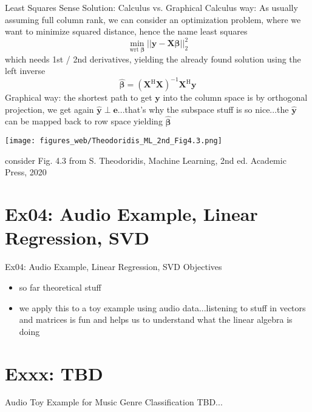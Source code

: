 \documentclass[mathserif, aspectratio=43]{intbeamer}
\begin{document}
\begin{frame}{Least Squares Sense Solution: Calculus vs. Graphical}
Calculus way: As usually assuming full column rank, we can consider an optimization problem, where we want to minimize
squared distance, hence the name least squares
$$\min_{\text{wrt }\bm{\beta}} ||\bm{y} - \bm{X} \bm{\beta}||_2^2$$
which needs 1st / 2nd derivatives, yielding the already found solution using the left inverse
$$\hat{\bm{\beta}} = (\bm{X}^\mathrm{H}\bm{X})^{-1} \bm{X}^\mathrm{H} \bm{y}$$
Graphical way: the shortest path to get $\bm{y}$ into the column space is by orthogonal projection, we get again $\hat{\bm{y}} \perp \bm{e}$...that's why the subspace
stuff is so nice...the $\hat{\bm{y}}$ can be mapped back to row space yielding $\hat{\bm{\beta}}$
\begin{center}
\texttt{[image: figures\_web/Theodoridis\_ML\_2nd\_Fig4.3.png]}
\end{center}
\begin{footnotesize}consider Fig. 4.3 from S. Theodoridis, Machine Learning, 2nd ed. Academic Press, 2020\end{footnotesize}
\end{frame}

\section{Ex04: Audio Example, Linear Regression, SVD}
\begin{frame}{Ex04: Audio Example, Linear Regression, SVD}
Objectives
\begin{itemize}
\item so far theoretical stuff
\item we apply this to a toy example using audio data...listening to stuff in vectors and matrices is fun and helps us to understand what the linear algebra is doing
\end{itemize}
\end{frame}


\section{Exxx: TBD}
\begin{frame}{Audio Toy Example for Music Genre Classification}
TBD...
\end{frame}





\end{document}
